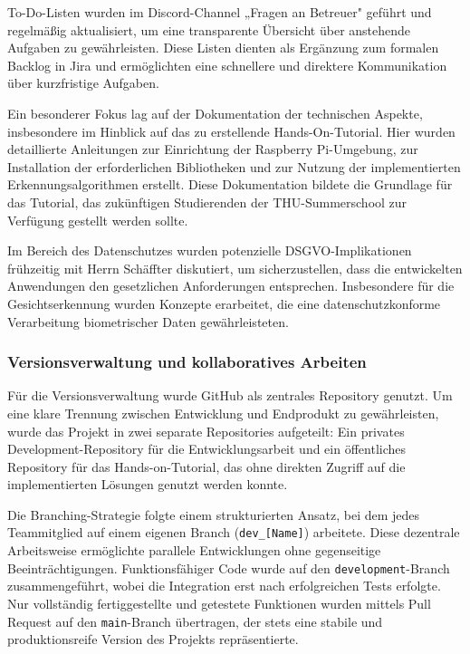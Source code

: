 To-Do-Listen wurden im Discord-Channel „Fragen an Betreuer" geführt und regelmäßig aktualisiert, um eine transparente Übersicht über anstehende Aufgaben zu gewährleisten. Diese Listen dienten als Ergänzung zum formalen Backlog in Jira und ermöglichten eine schnellere und direktere Kommunikation über kurzfristige Aufgaben.

Ein besonderer Fokus lag auf der Dokumentation der technischen Aspekte, insbesondere im Hinblick auf das zu erstellende Hands-On-Tutorial. Hier wurden detaillierte Anleitungen zur Einrichtung der Raspberry Pi-Umgebung, zur Installation der erforderlichen Bibliotheken und zur Nutzung der implementierten Erkennungsalgorithmen erstellt. Diese Dokumentation bildete die Grundlage für das Tutorial, das zukünftigen Studierenden der THU-Summerschool zur Verfügung gestellt werden sollte.

Im Bereich des Datenschutzes wurden potenzielle DSGVO-Implikationen frühzeitig mit Herrn Schäffter diskutiert, um sicherzustellen, dass die entwickelten Anwendungen den gesetzlichen Anforderungen entsprechen. Insbesondere für die Gesichtserkennung wurden Konzepte erarbeitet, die eine datenschutzkonforme Verarbeitung biometrischer Daten gewährleisteten.

\subsubsection{Versionsverwaltung und kollaboratives Arbeiten}

Für die Versionsverwaltung wurde GitHub als zentrales Repository genutzt. Um eine klare Trennung zwischen Entwicklung und Endprodukt zu gewährleisten, wurde das Projekt in zwei separate Repositories aufgeteilt: Ein privates Development-Repository für die Entwicklungsarbeit und ein öffentliches Repository für das Hands-on-Tutorial, das ohne direkten Zugriff auf die implementierten Lösungen genutzt werden konnte.

Die Branching-Strategie folgte einem strukturierten Ansatz, bei dem jedes Teammitglied auf einem eigenen Branch (\texttt{dev\_[Name]}) arbeitete. Diese dezentrale Arbeitsweise ermöglichte parallele Entwicklungen ohne gegenseitige Beeinträchtigungen. Funktionsfähiger Code wurde auf den \texttt{development}-Branch zusammengeführt, wobei die Integration erst nach erfolgreichen Tests erfolgte. Nur vollständig fertiggestellte und getestete Funktionen wurden mittels Pull Request auf den \texttt{main}-Branch übertragen, der stets eine stabile und produktionsreife Version des Projekts repräsentierte.

